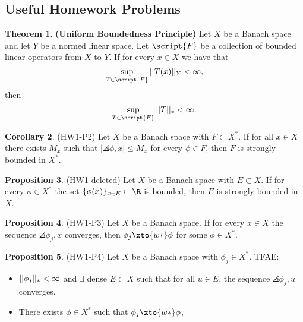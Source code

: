 \documentclass[a5paper]{article}
\theoremstyle{definition}%
\newtheorem{theorem}{Theorem}
\newtheorem{corollary}[theorem]{Corollary}
\newtheorem{proposition}[theorem]{Proposition}
\numberwithin{exercise}{section}
\theoremstyle{remark}%
\begin{document}
%
%
%

\pagebreak
\subsection{Useful Homework Problems}

\begin{highlight}
\begin{theorem}\textbf{(Uniform Boundedness Principle)}
Let $X$ be a Banach space and let $Y$ be a normed linear space. Let $\script{F}$ be a collection of bounded linear operators from $X$ to $Y$. If for every $x\in X$ we have that 
$$\sup\limits_{T\in \script{F}}\norm{T(x)}_Y<\infty,$$ 
then 
$$\sup\limits_{T\in\script{F}}\norm{T}_*<\infty.$$ 
\end{theorem}
\end{highlight}

\begin{highlight}
\begin{corollary}(HW1-P2)
Let $X$ be a Banach space with $F\subset X^*$. If for all $x\in X$ there exists $M_x$ such that $|\angles{\phi,x}|\leq M_x$ for every $\phi\in F$, then $F$ is strongly bounded in $X^*$. 
\end{corollary}
\end{highlight}

\begin{highlight}
\begin{proposition}(HW1-deleted)
Let $X$ be a Banach space with $E\subset X$. If for every $\phi\in X^*$ the set $\{\phi(x)\}_{x\in E}\subset \R$ is bounded, then $E$ is strongly bounded in $X$. 
\end{proposition}
\end{highlight}

\begin{highlight}
\begin{proposition}(HW1-P3)
Let $X$ be a Banach space. If for every $x\in X$ the sequence $\angles{\phi_j,x}$ converges, then $\phi_j\xto{w*}\phi$ for some $\phi\in X^*$. 
\end{proposition}
\end{highlight}

\begin{highlight}
\begin{proposition}(HW1-P4)
Let $X$ be a Banach space with $\phi_j\in X^*$. TFAE:
	\begin{itemize}
	\item $\norm{\phi_j}_*<\infty$ and $\exists$ dense $E\subset X$ such that for all $u\in E$, the sequence $\angles{\phi_j,u}$ converges.	
	\item There exists $\phi\in X^*$ such that $\phi_j\xto{w*}\phi$,
	\end{itemize}
\end{proposition}
\end{highlight}
\end{document}
